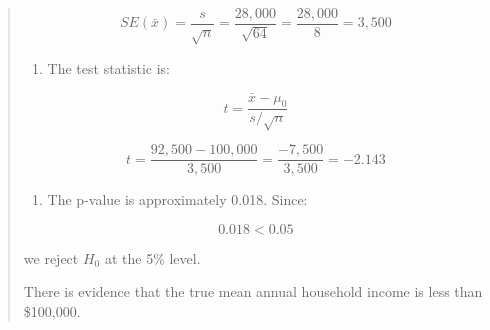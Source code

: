 \documentclass[
  letterpaper,
  DIV=11,
  numbers=noendperiod]{scrreprt}
\providecommand{\tightlist}{%
  \setlength{\itemsep}{0pt}\setlength{\parskip}{0pt}}
\begin{document}
\begin{tcolorbox}
\begin{quote}
\[
SE(\bar{x})
=
\frac{s}{\sqrt{n}}
=
\frac{28{,}000}{\sqrt{64}}
=
\frac{28{,}000}{8}
=
3{,}500
\]

\begin{enumerate}
\def\labelenumi{\alph{enumi}.}
\setcounter{enumi}{1}
\tightlist
\item
  The test statistic is:
\end{enumerate}

\[
t =
\frac{\bar{x} - \mu_0}{s/\sqrt{n}}
\]

\[
t =
\frac{92{,}500 - 100{,}000}{3{,}500}
=
\frac{-7{,}500}{3{,}500}
=
-2.143
\]

\begin{enumerate}
\def\labelenumi{\alph{enumi}.}
\setcounter{enumi}{2}
\tightlist
\item
  The p-value is approximately 0.018. Since:
\end{enumerate}

\[
0.018 < 0.05
\]

we reject \(H_0\) at the 5\% level.

There is evidence that the true mean annual household income is less
than \$100,000.
\end{quote}

\end{tcolorbox}
\end{document}
